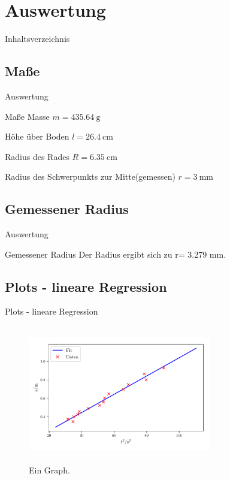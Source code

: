 \section{Auswertung}

\begin{frame}{Inhaltsverzeichnis}
\end{frame} 

\subsection{Maße}

\begin{frame}{Auswertung}
    \begin{block}{Maße}
    Masse $m = \SI{435.64}{\gram}$

    Höhe über Boden $l= \SI{26.4}{\centi\meter}$
    
    Radius des Rades $R =\SI{6.35}{\centi\meter}$
    
    Radius des Schwerpunkts zur Mitte(gemessen) $r= \SI{3}{\milli\meter}$
    \end{block}
\end{frame}
\subsection{Gemessener Radius}
\begin{frame}{Auswertung}

    \begin{block}{Gemessener Radius}
        Der Radius ergibt sich zu r= 3.279 \si{\milli\meter}. 
    \end{block}
\end{frame}

\subsection{Plots - lineare Regression}

\begin{frame}{Plots - lineare Regression}
    \begin{figure}   
    
    \centering
    \includegraphics[width=8cm, height=6cm]{build/plot1b.pdf}
    \caption{Ein Graph.} 

    \label{fig:plot1b}
\end{figure}
\end{frame}

